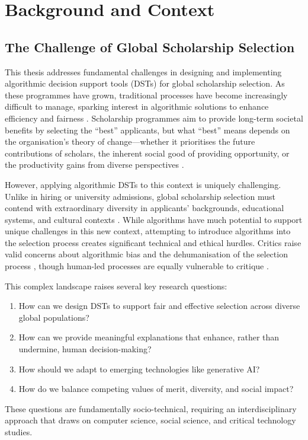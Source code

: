\chapter{\label{ch:context}Background and Context}

\minitoc

\section{The Challenge of Global Scholarship Selection}\label{sec:context_challenge}

This thesis addresses fundamental challenges in designing and implementing algorithmic decision support tools (DSTs) for global scholarship selection. As these programmes have grown, traditional processes have become increasingly difficult to manage, sparking interest in algorithmic solutions to enhance efficiency and fairness \cite{Latzer_Hollnbuchner_Just_Saurwein_2014}. Scholarship programmes aim to provide long-term societal benefits by selecting the ``best'' applicants, but what ``best'' means depends on the organisation's theory of change—whether it prioritises the future contributions of scholars, the inherent social good of providing opportunity, or the productivity gains from diverse perspectives \cite{DilraboJonbekova_Ruby_2023, Dassin_Marsh_Mawer_2018, noray2023systemic}.

However, applying algorithmic DSTs to this context is uniquely challenging. Unlike in hiring or university admissions, global scholarship selection must contend with extraordinary diversity in applicants' backgrounds, educational systems, and cultural contexts \cite{Warikoo_2019}. While algorithms have much potential to support unique challenges in this new context, attempting to introduce algorithms into the selection process creates significant technical and ethical hurdles. Critics raise valid concerns about algorithmic bias and the dehumanisation of the selection process \cite{dwork_fairness_2012, binns_its_2018}, though human-led processes are equally vulnerable to critique \cite{Ahnaf2023AHPAP}.

This complex landscape raises several key research questions:
\begin{enumerate}
    \item How can we design DSTs to support fair and effective selection across diverse global populations?
    \item How can we provide meaningful explanations that enhance, rather than undermine, human decision-making?
    \item How should we adapt to emerging technologies like generative AI?
    \item How do we balance competing values of merit, diversity, and social impact?
\end{enumerate}
These questions are fundamentally socio-technical, requiring an interdisciplinary approach that draws on computer science, social science, and critical technology studies.

